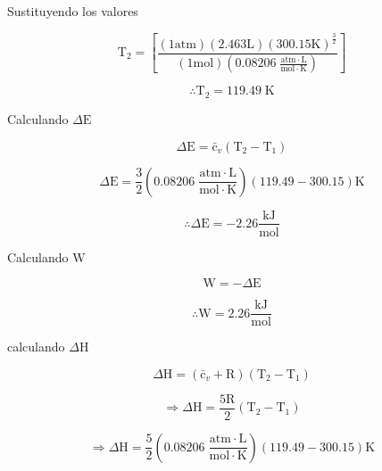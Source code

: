 \documentclass[12pt]{article}
\begin{document}
Sustituyendo los valores

\begin{displaymath}
	\mathrm{T}_2=\left[ \frac{(1\mathrm{atm})(2.463\mathrm{L})(300.15\mathrm{K})^{\frac{3}{2}}}{(1\mathrm{mol})(0.08206\; \frac{\mathrm{atm}\cdot\mathrm{L}}{\mathrm{mol}\cdot\mathrm{K}})} \right]
\end{displaymath}

\begin{displaymath}
	\therefore\mathrm{T}_2= 119.49\;\mathrm{K}
\end{displaymath}

Calculando $\Delta\mathrm{E}$

\begin{displaymath}
	\Delta\mathrm{E}=\mathrm{\bar{c}}_v(\mathrm{T}_2-\mathrm{T}_1)
\end{displaymath}

\begin{displaymath}
	\Delta\mathrm{E}=\frac{3}{2}\left( 0.08206\; \frac{\mathrm{atm}\cdot\mathrm{L}}{\mathrm{mol}\cdot\mathrm{K}} \right) \left(119.49-300.15\right)\mathrm{K}
\end{displaymath}

\begin{displaymath}
	\therefore\Delta\mathrm{E}=-2.26\frac{\mathrm{kJ}}{\mathrm{mol}}
\end{displaymath}

Calculando $\mathrm{W}$

\begin{displaymath}
	\mathrm{W}=-\Delta\mathrm{E}
\end{displaymath}

\begin{displaymath}
	\therefore\mathrm{W}=2.26\frac{\mathrm{kJ}}{\mathrm{mol}}
\end{displaymath}

calculando $\Delta\mathrm{H}$

\begin{displaymath}
	\Delta\mathrm{H}=(\mathrm{\bar{c}}_v+\mathrm{R})(\mathrm{T}_2-\mathrm{T}_1)
\end{displaymath}

\begin{displaymath}
	\Rightarrow\Delta\mathrm{H}=\frac{5\mathrm{R}}{2}(\mathrm{T}_2-\mathrm{T}_1)
\end{displaymath}

\begin{displaymath}
	\Rightarrow\Delta\mathrm{H}=\frac{5}{2}\left( 0.08206\; \frac{\mathrm{atm}\cdot\mathrm{L}}{\mathrm{mol}\cdot\mathrm{K}} \right)\left( 119.49-300.15 \right)\mathrm{K}
\end{displaymath}
\end{document}
